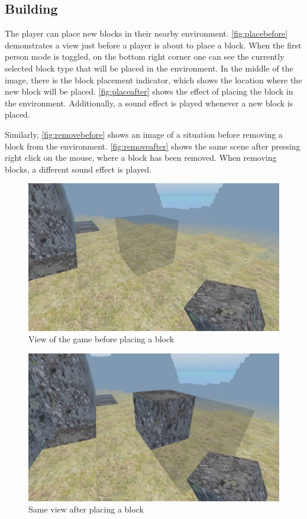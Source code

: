 \documentclass{report}
\begin{document}
\subsection{Building}
The player can place new blocks in their nearby environment. \autoref{fig:placebefore} demonstrates a view just before a player is about to place a block. When the first person mode is toggled, on the bottom right corner one can see the currently selected block type that will be placed in the environment. In the middle of the image, there is the block placement indicator, which shows the location where the new block will be placed. \autoref{fig:placeafter} shows the effect of placing the block in the environment. Additionally, a sound effect is played whenever a new block is placed.\par
Similarly, \autoref{fig:removebefore} shows an image of a situation before removing a block from the environment. \autoref{fig:removeafter} shows the same scene after pressing right click on the mouse, where a block has been removed. When removing blocks, a different sound effect is played.
\begin{figure}[hp]
	\centering
	\includegraphics[scale=0.5]{placeblockbefore}
	\caption{View of the game before placing a block}
	\label{fig:placebefore}
\end{figure}
\begin{figure}[hp]
	\centering
	\includegraphics[scale=0.5]{placeblockafter}
	\caption{Same view after placing a block}
	\label{fig:placeafter}
\end{figure}
\end{document}
